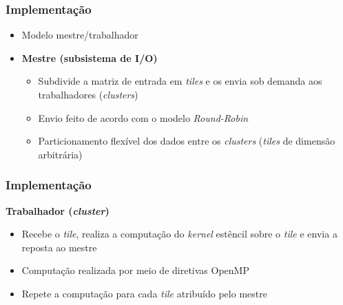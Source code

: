 \documentclass[xcolor={table}]{beamer}
\begin{document}

\begin{frame}\frametitle{Implementação}
    \begin{itemize}
        \item {Modelo mestre/trabalhador}
        \item \textbf{Mestre (subsistema de I/O)}
            \begin{itemize}
                \item {Subdivide a matriz de entrada em \textit{tiles} e os envia sob demanda aos trabalhadores (\textit{clusters})}
                \item {Envio feito de acordo com o modelo \textit{Round-Robin}}
                \item {Particionamento flexível dos dados entre os \textit{clusters} (\textit{tiles} de dimensão arbitrária)}
            \end{itemize}
    \end{itemize}
\end{frame}


\begin{frame}\frametitle{Implementação}
    \textbf{Trabalhador (\textit{cluster})}
    \begin{itemize}
        \item {Recebe o \textit{tile}, realiza a computação do \textit{kernel} estêncil sobre o \textit{tile} e envia a reposta ao mestre}
            \item {Computação realizada por meio de diretivas OpenMP}
        \item {Repete a computação para cada \textit{tile} atribuído pelo mestre}
    \end{itemize}
\end{frame}
\end{document}
